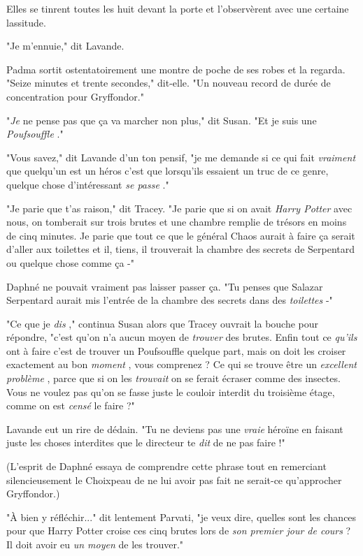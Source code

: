 Elles se tinrent toutes les huit devant la porte et l'observèrent avec une certaine lassitude.

"Je m'ennuie," dit Lavande.

Padma sortit ostentatoirement une montre de poche de ses robes et la regarda. "Seize minutes et trente secondes," dit-elle. "Un nouveau record de durée de concentration pour Gryffondor."

"\emph{Je}  ne pense pas que ça va marcher non plus," dit Susan. "Et je suis une \emph{Poufsouffle} ."

"Vous savez," dit Lavande d'un ton pensif, "je me demande si ce qui fait \emph{vraiment}  que quelqu'un est un héros c'est que lorsqu'ils essaient un truc de ce genre, quelque chose d'intéressant \emph{se passe} ."

"Je parie que t'as raison," dit Tracey. "Je parie que si on avait \emph{Harry Potter}  avec nous, on tomberait sur trois brutes et une chambre remplie de trésors en moins de cinq minutes. Je parie que tout ce que le général Chaos aurait à faire ça serait d'aller aux toilettes et il, tiens, il trouverait la chambre des secrets de Serpentard ou quelque chose comme ça -"

Daphné ne pouvait vraiment pas laisser passer ça. "Tu penses que Salazar Serpentard aurait mis l'entrée de la chambre des secrets dans des \emph{toilettes}  -"

"Ce que je \emph{dis} ," continua Susan alors que Tracey ouvrait la bouche pour répondre, "c'est qu'on n'a aucun moyen de \emph{trouver}  des brutes. Enfin tout ce \emph{qu'ils}  ont à faire c'est de trouver un Poufsouffle quelque part, mais on doit les croiser exactement au bon \emph{moment} , vous comprenez ? Ce qui se trouve être un \emph{excellent problème} , parce que si on les \emph{trouvait}  on se ferait écraser comme des insectes. Vous ne voulez pas qu'on se fasse juste le couloir interdit du troisième étage, comme on est \emph{censé}  le faire ?"

Lavande eut un rire de dédain. "Tu ne deviens pas une \emph{vraie}  héroïne en faisant juste les choses interdites que le directeur te \emph{dit}  de ne pas faire !"

(L'esprit de Daphné essaya de comprendre cette phrase tout en remerciant silencieusement le Choixpeau de ne lui avoir pas fait ne serait-ce qu'approcher Gryffondor.)

"À bien y réfléchir..." dit lentement Parvati, "je veux dire, quelles sont les chances pour que Harry Potter croise ces cinq brutes lors de \emph{son premier jour de cours } ? Il doit avoir eu \emph{un moyen}  de les trouver."

